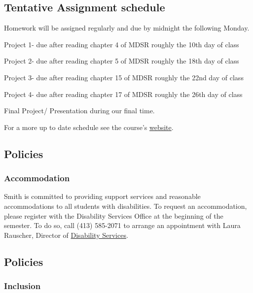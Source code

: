 \documentclass[
  letterpaper,
  DIV=11,
  numbers=noendperiod]{scrartcl}
\begin{document}
\hypertarget{tentative-assignment-schedule}{%
\subsection{Tentative Assignment
schedule}\label{tentative-assignment-schedule}}

Homework will be assigned regularly and due by midnight the following
Monday.

Project 1- due after reading chapter 4 of MDSR roughly the 10th day of
class

Project 2- due after reading chapter 5 of MDSR roughly the 18th day of
class

Project 3- due after reading chapter 15 of MDSR roughly the 22nd day of
class

Project 4- due after reading chapter 17 of MDSR roughly the 26th day of
class

Final Project/ Presentation during our final time.

For a more up to date schedule see the course's
\href{../index.html}{website}.

\hypertarget{policies-1}{%
\subsection{Policies}\label{policies-1}}

\hypertarget{accommodation}{%
\subsubsection{Accommodation}\label{accommodation}}

Smith is committed to providing support services and reasonable
accommodations to all students with disabilities. To request an
accommodation, please register with the Disability Services Office at
the beginning of the semester. To do so, call (413) 585-2071 to arrange
an appointment with Laura Rauscher, Director of
\href{https://www.smith.edu/about-smith/disability-services}{Disability
Services}.

\hypertarget{policies-2}{%
\subsection*{Policies}\label{policies-2}}

\hypertarget{inclusion}{%
\subsubsection{Inclusion}\label{inclusion}}
\end{document}
